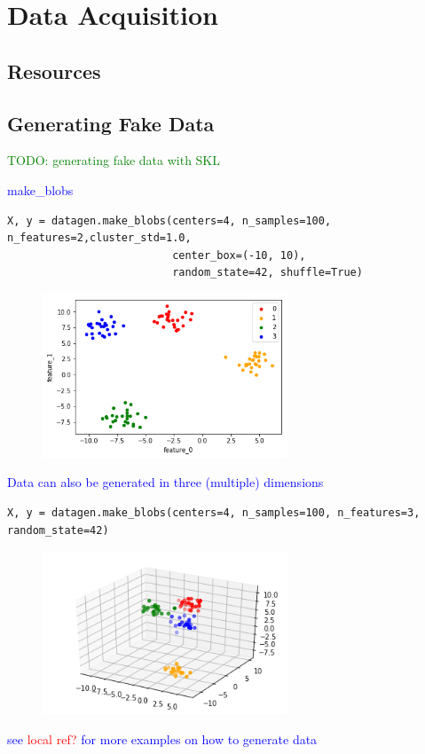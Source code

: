 \section{Data Acquisition}


\subsection{Resources}

\subsection{Generating Fake Data}

\textcolor{green}{TODO: generating fake data with SKL}

\textcolor{blue}{make\_blobs}

\begin{lstlisting}[style=pyInStyle]
X, y = datagen.make_blobs(centers=4, n_samples=100, n_features=2,cluster_std=1.0,
                          center_box=(-10, 10),
                          random_state=42, shuffle=True)
\end{lstlisting}

\begin{figure}
\centering
\includegraphics[width=0.65\textwidth]{./sync_imgs/datagen/blobs/2dimg.png}
\label{fig:datagen_blobs_2dimg}
\end{figure}

\textcolor{blue}{Data can also be generated in three (multiple) dimensions}

\begin{lstlisting}[style=pyInStyle]
X, y = datagen.make_blobs(centers=4, n_samples=100, n_features=3, random_state=42)
\end{lstlisting}

\begin{figure}
\centering
\includegraphics[width=0.65\textwidth]{./sync_imgs/datagen/blobs/3dimg.png}
\label{fig:datagen_blobs_3dimg}
\end{figure}



\textcolor{blue}{see \textcolor{red}{local ref?} for more examples on how to generate data}
